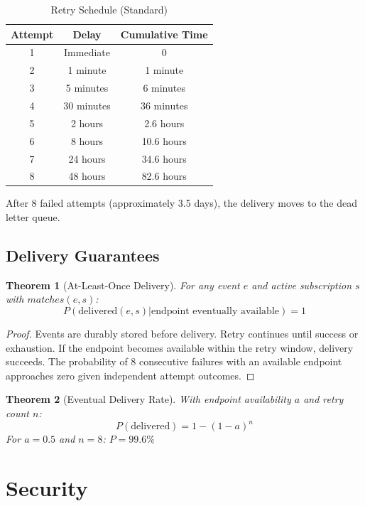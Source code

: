 \documentclass[11pt,a4paper]{article}
\newtheorem{theorem}{Theorem}[section]
\begin{document}
\begin{table}[h]
\centering
\caption{Retry Schedule (Standard)}
\begin{tabular}{ccc}
\toprule
\textbf{Attempt} & \textbf{Delay} & \textbf{Cumulative Time} \\
\midrule
1 & Immediate & 0 \\
2 & 1 minute & 1 minute \\
3 & 5 minutes & 6 minutes \\
4 & 30 minutes & 36 minutes \\
5 & 2 hours & 2.6 hours \\
6 & 8 hours & 10.6 hours \\
7 & 24 hours & 34.6 hours \\
8 & 48 hours & 82.6 hours \\
\bottomrule
\end{tabular}
\end{table}

After 8 failed attempts (approximately 3.5 days), the delivery moves to the dead letter queue.

\subsection{Delivery Guarantees}

\begin{theorem}[At-Least-Once Delivery]
For any event $e$ and active subscription $s$ with $matches(e, s)$:
\[
P(\text{delivered}(e, s) | \text{endpoint eventually available}) = 1
\]
\end{theorem}

\begin{proof}
Events are durably stored before delivery. Retry continues until success or exhaustion. If the endpoint becomes available within the retry window, delivery succeeds. The probability of 8 consecutive failures with an available endpoint approaches zero given independent attempt outcomes.
\end{proof}

\begin{theorem}[Eventual Delivery Rate]
With endpoint availability $a$ and retry count $n$:
\begin{equation}
P(\text{delivered}) = 1 - (1-a)^n
\end{equation}
For $a = 0.5$ and $n = 8$: $P = 99.6\%$
\end{theorem}

\section{Security}
\end{document}
